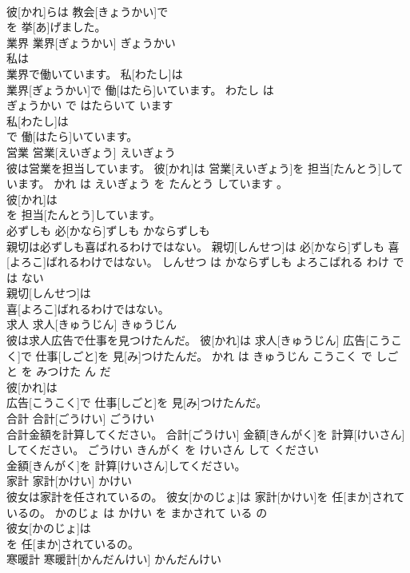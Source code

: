 \documentclass[8pt]{extreport}
\begin{document}
\begin{CJK}{UTF8}{min}
\\	彼[かれ]らは 教会[きょうかい]で
\\	を 挙[あ]げました。			
\\	業界	業界[ぎょうかい]	ぎょうかい	
\\	私は
\\	業界で働いています。	私[わたし]は
\\	業界[ぎょうかい]で 働[はたら]いています。	わたし は 
\\	ぎょうかい で はたらいて います	
\\	私[わたし]は
\\	で 働[はたら]いています。			
\\	営業	営業[えいぎょう]	えいぎょう	
\\	彼は営業を担当しています。	彼[かれ]は 営業[えいぎょう]を 担当[たんとう]しています。	かれ は えいぎょう を たんとう しています 。	
\\	彼[かれ]は
\\	を 担当[たんとう]しています。			
\\	必ずしも	必[かなら]ずしも	かならずしも	
\\	親切は必ずしも喜ばれるわけではない。	親切[しんせつ]は 必[かなら]ずしも 喜[よろこ]ばれるわけではない。	しんせつ は かならずしも よろこばれる わけ で は ない	
\\	親切[しんせつ]は
\\	喜[よろこ]ばれるわけではない。			
\\	求人	求人[きゅうじん]	きゅうじん	
\\	彼は求人広告で仕事を見つけたんだ。	彼[かれ]は 求人[きゅうじん] 広告[こうこく]で 仕事[しごと]を 見[み]つけたんだ。	かれ は きゅうじん こうこく で しごと を みつけた ん だ	
\\	彼[かれ]は
\\	広告[こうこく]で 仕事[しごと]を 見[み]つけたんだ。			
\\	合計	合計[ごうけい]	ごうけい	
\\	合計金額を計算してください。	合計[ごうけい] 金額[きんがく]を 計算[けいさん]してください。	ごうけい きんがく を けいさん して ください	
\\	金額[きんがく]を 計算[けいさん]してください。			
\\	家計	家計[かけい]	かけい	
\\	彼女は家計を任されているの。	彼女[かのじょ]は 家計[かけい]を 任[まか]されているの。	かのじょ は かけい を まかされて いる の	
\\	彼女[かのじょ]は
\\	を 任[まか]されているの。			
\\	寒暖計	寒暖計[かんだんけい]	かんだんけい	

\end{CJK}
\end{document}
